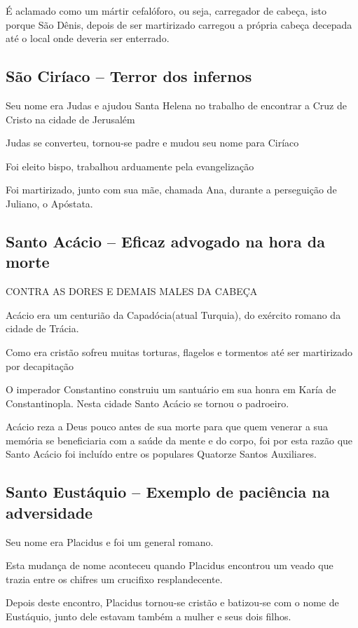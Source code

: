 \documentclass[a4paper,12pt]{extarticle} \usepackage[utf8]{inputenc}
\begin{document}
É aclamado como um mártir cefalóforo, ou seja, carregador de cabeça, isto porque São Dênis, depois de ser martirizado carregou a própria cabeça decepada até o local onde deveria ser enterrado.

\subsection{São Ciríaco – Terror dos infernos}

Seu nome era Judas e ajudou Santa Helena no trabalho de encontrar a Cruz de Cristo na cidade de Jerusalém

Judas se converteu, tornou-se padre e mudou seu nome para Ciríaco

Foi eleito bispo, trabalhou arduamente pela evangelização

Foi martirizado, junto com sua mãe, chamada Ana, durante a perseguição de Juliano, o Apóstata.

\subsection{Santo Acácio – Eficaz advogado na hora da morte}

CONTRA AS DORES E DEMAIS MALES DA CABEÇA

Acácio era um centurião da Capadócia(atual Turquia), do exército romano da cidade de Trácia.

Como era cristão sofreu muitas torturas, flagelos e tormentos até ser martirizado por decapitação

O imperador Constantino construiu um santuário em sua honra em Karía de Constantinopla. Nesta cidade Santo Acácio se tornou o padroeiro.

Acácio reza a Deus  pouco antes de sua morte para que quem venerar a sua memória se beneficiaria com a saúde da mente e do corpo, foi por esta razão que Santo Acácio foi incluído entre os populares Quatorze Santos Auxiliares.


\subsection{Santo Eustáquio – Exemplo de paciência  na adversidade}

Seu nome era Placidus e foi um general romano.

Esta mudança de nome aconteceu quando Placidus encontrou um veado que trazia entre os chifres um crucifixo resplandecente.

Depois deste encontro, Placidus tornou-se cristão e batizou-se com o nome de Eustáquio, junto dele estavam também a mulher e seus dois filhos.
\end{document}
